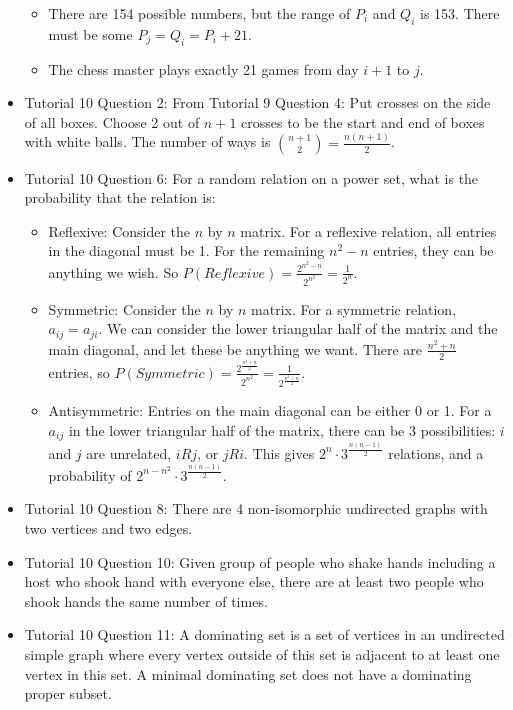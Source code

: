 \documentclass[10pt, portrait]{article}
\begin{document}
\begin{multicols*}{2}
\begin{itemize}
\begin{itemize}
        \item There are 154 possible numbers, but the range of $P_i$ and $Q_i$ is 153. There must be some $P_j=Q_i=P_i+21$.
        \item The chess master plays exactly 21 games from day $i+1$ to $j$.
    \end{itemize} 
    \item Tutorial 10 Question 2: From Tutorial 9 Question 4: Put crosses on the side of all boxes. Choose 2 out of $n+1$ crosses to be the start and end of boxes with white balls. The number of ways is ${n+1 \choose 2} = \frac{n(n+1)}{2}$.
    \item Tutorial 10 Question 6: For a random relation on a power set, what is the probability that the relation is:
    \begin{itemize}
        \item Reflexive: Consider the $n$ by $n$ matrix. For a reflexive relation, all entries in the diagonal must be 1. For the remaining $n^2-n$ entries, they can be anything we wish. So $P(Reflexive)=\frac{2^{n^2-n}}{2^{n^2}}=\frac{1}{2^n}$.
        \item Symmetric: Consider the $n$ by $n$ matrix. For a symmetric relation, $a_{ij} = a_{ji}$. We can consider the lower triangular half of the matrix and the main diagonal, and let these be anything we want. There are $\frac{n^2+n}{2}$ entries, so $P(Symmetric)=\frac{2^{\frac{n^2+n}{2}}}{2^{n^2}}=\frac{1}{2^{\frac{n^2-n}{2}}}$.
        \item Antisymmetric: Entries on the main diagonal can be either 0 or 1. For a $a_{ij}$ in the lower triangular half of the matrix, there can be 3 possibilities: $i$ and $j$ are unrelated, $iRj$, or $jRi$. This gives $2^n\cdot3^{\frac{n(n-1)}{2}}$ relations, and a probability of $2^{n-n^2}\cdot3^{\frac{n(n-1)}{2}}$. 
    \end{itemize}
    \item Tutorial 10 Question 8: There are 4 non-isomorphic undirected graphs with two vertices and two edges.
    \item Tutorial 10 Question 10: Given  group of people who shake hands including a host who shook hand with everyone else, there are at least two people who shook hands the same number of times.
    \item Tutorial 10 Question 11: A dominating set is a set of vertices in an undirected simple graph where every vertex outside of this set is adjacent to at least one vertex in this set. A minimal dominating set does not have a dominating proper subset.

\end{itemize}
\end{multicols*}
\end{document}
